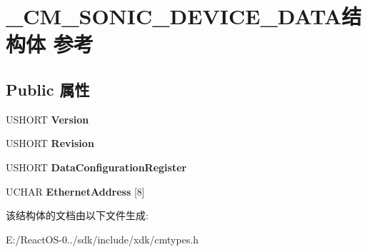 \hypertarget{struct___c_m___s_o_n_i_c___d_e_v_i_c_e___d_a_t_a}{}\section{\+\_\+\+C\+M\+\_\+\+S\+O\+N\+I\+C\+\_\+\+D\+E\+V\+I\+C\+E\+\_\+\+D\+A\+T\+A结构体 参考}
\label{struct___c_m___s_o_n_i_c___d_e_v_i_c_e___d_a_t_a}
\subsection*{Public 属性}
\begin{DoxyCompactItemize}
\item 
\mbox{\label{struct___c_m___s_o_n_i_c___d_e_v_i_c_e___d_a_t_a_a79b7bcbe2b53bf7bc0c2f3c328d40ead}} 
U\+S\+H\+O\+RT {\bfseries Version}
\item 
\mbox{\label{struct___c_m___s_o_n_i_c___d_e_v_i_c_e___d_a_t_a_a9a7b7b640e7b4088c361d432f7de68c2}} 
U\+S\+H\+O\+RT {\bfseries Revision}
\item 
\mbox{\label{struct___c_m___s_o_n_i_c___d_e_v_i_c_e___d_a_t_a_ae6555739e05b152e2b1c0f536e9ce280}} 
U\+S\+H\+O\+RT {\bfseries Data\+Configuration\+Register}
\item 
\mbox{\label{struct___c_m___s_o_n_i_c___d_e_v_i_c_e___d_a_t_a_a9bd39754f514395dd04c40aabf781ed9}} 
U\+C\+H\+AR {\bfseries Ethernet\+Address} \mbox{[}8\mbox{]}
\end{DoxyCompactItemize}


该结构体的文档由以下文件生成\+:\begin{DoxyCompactItemize}
\item 
E\+:/\+React\+O\+S-\/0../sdk/include/xdk/cmtypes.\+h\end{DoxyCompactItemize}
